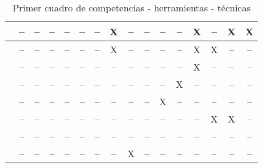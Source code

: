 \begin{landscape}
\begin{table}[H]
\begin{center}
\begin{tabular}{| c | c | c | c | c | c | c | c | c | c | c | c | c | c | c | c | }
    \hline
    \cite{Liao:2013} 			& -- & -- & -- & -- & -- & -- & X   & -- & -- & -- & -- & X  & -- & X & X \\
    \hline
    \cite{Colomo-Palacios:2013} 	& -- & -- & -- & -- & -- & -- & X   & -- & -- & -- & -- & X  & X & -- & -- \\
    \hline
    \cite{McMahon:2007} 		& -- & -- & --  & -- & -- & -- & --  & -- & -- & -- & -- & X  & -- & -- & -- \\
    \hline
    \cite{Rashid:2008} 			& -- & -- & --  & -- & -- & -- & --  & -- &  -- & -- & X & -- & -- & -- & --  \\
    \hline
    \cite{Lim:2011} 			& -- & -- & --  & -- & -- & -- & --  & -- & -- & X & --  & -- & -- & -- & -- \\
    \hline
    \cite{Achcaoucaou:2012} 		& -- & -- & --  & -- & -- & --  & -- & -- & -- & -- & -- & -- & X & X & --  \\
    \hline
    \cite{Guenaga:2013} 		& -- & -- & --  & -- & -- & -- & -- & -- & --  & -- & -- & -- & -- & -- & --  \\
    \hline
    \cite{Martin-Cuadrado:2013} 	& -- & -- & --  & -- & --& -- & --  & X  & -- & -- & -- & -- & -- & -- & -- \\
    \hline
  \end{tabular}
\end{center}
\caption{Primer cuadro de competencias - herramientas - técnicas}
\label{tab:CuadroPreguntas1}
\end{table} 


\end{landscape}
